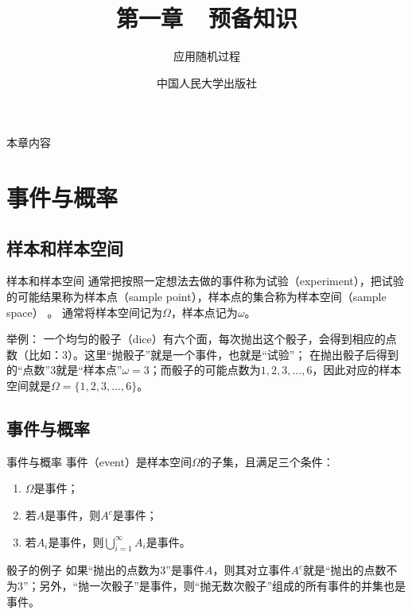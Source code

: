 \documentclass[t]{beamer}
\begin{document}
\fontsize{11}{18}\selectfont


\CTEXindent



  \title{第一章~~预备知识}
\author{应用随机过程}
\date{中国人民大学出版社}
  \begin{frame}
    \maketitle
  \end{frame}

\begin{frame}{本章内容}
  \begin{multicols}{2}
    \tableofcontents
  \end{multicols}
\end{frame}

\section{事件与概率}
\subsection{样本和样本空间}
\begin{frame}{样本和样本空间}
  通常把按照一定想法去做的事件称为试验（experiment），把试验的可能结果称为样本点（sample
point），样本点的集合称为样本空间（sample space）
。
通常将样本空间记为$\Omega$，样本点记为$\omega$。

\begin{block}{举例：}
  一个均匀的骰子（dice）有六个面，每次抛出这个骰子，会得到相应的点数（比如：3）。这里“抛骰子”就是一个事件，也就是“试验”；
  在抛出骰子后得到的“点数”3就是“样本点”$\omega=3$；而骰子的可能点数为$1,2,3,\ldots,6$，因此对应的样本空间就是$\Omega=\{1,2,3,\ldots,6\}$。
\end{block}
  
  \end{frame}

  \subsection{事件与概率}
  \begin{frame}{事件与概率}
    事件（event）是样本空间$\Omega$的子集，且满足三个条件：
    \begin{enumerate}
      \item $\Omega$是事件；
      \item 若$A$是事件，则$A^c$是事件；
      \item 若$A_i$是事件，则$\bigcup\limits^{\infty}_{i=1}A_i$是事件。
    \end{enumerate}
  
\begin{block}{骰子的例子}
  如果“抛出的点数为3”是事件$A$，则其对立事件$A^c$就是“抛出的点数不为3”；另外，“抛一次骰子”是事件，则“抛无数次骰子”组成的所有事件的并集也是事件。
\end{block}

  \end{frame}
\end{document}
